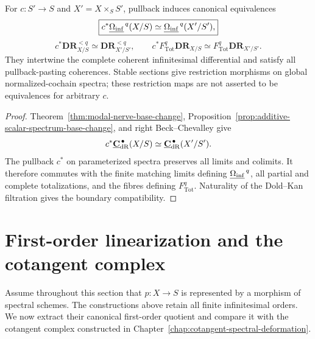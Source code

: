 \begin{proposition}
\label{prop:normalized-forms-base-change}
For \(c:S'\to S\) and \(X'=X\times_SS'\), pullback induces canonical equivalences
\[
\boxed{
    c^*\underline{\Omega_{\mathrm{inf}}}^{\,q}(X/S)
    \simeq
    \underline{\Omega_{\mathrm{inf}}}^{\,q}(X'/S'),
}
\]
\[
\boxed{
    c^*\mathbf{DR}_{X/S}^{<q}
    \simeq
    \mathbf{DR}_{X'/S'}^{<q},
    \qquad
    c^*F_{\mathrm{Tot}}^q\mathbf{DR}_{X/S}
    \simeq
    F_{\mathrm{Tot}}^q\mathbf{DR}_{X'/S'}.
}
\]
They intertwine the complete coherent infinitesimal differential and satisfy all pullback-pasting
coherences.  Stable sections give restriction morphisms on global normalized-cochain spectra; these restriction
maps are not asserted to be equivalences for arbitrary \(c\).
\end{proposition}

\begin{proof}
Theorem~\ref{thm:modal-nerve-base-change},
Proposition~\ref{prop:additive-scalar-spectrum-base-change}, and right Beck--Chevalley give
\[
    c^*\underline{\mathbf C}_{\mathrm{dR}}^{\,\bullet}(X/S)
    \simeq
    \underline{\mathbf C}_{\mathrm{dR}}^{\,\bullet}(X'/S').
\]
The pullback \(c^*\) on parameterized spectra preserves all limits and colimits.  It therefore
commutes with the finite matching limits defining \(\underline{\Omega_{\mathrm{inf}}}^{\,q}\), all partial and complete
totalizations, and the fibres defining \(F_{\mathrm{Tot}}^q\).  Naturality of the Dold--Kan filtration gives the
boundary compatibility.
\end{proof}


\section{First-order linearization and the cotangent complex}
\label{sec:first-order-linearization-cotangent}

Assume throughout this section that \(p:X\to S\) is represented by a morphism of spectral schemes.
The constructions above retain all finite infinitesimal orders.  We now extract their canonical
first-order quotient and compare it with the cotangent complex constructed in
Chapter~\ref{chap:cotangent-spectral-deformation}.


